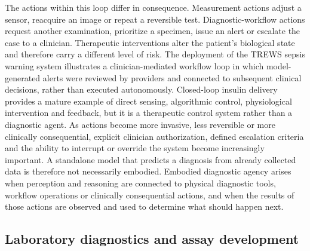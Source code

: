 \documentclass[12pt,a4paper]{article}
\begin{document}
The actions within this loop differ in consequence. Measurement actions adjust a sensor, reacquire an image or repeat a reversible test. Diagnostic-workflow actions request another examination, prioritize a specimen, issue an alert or escalate the case to a clinician. Therapeutic interventions alter the patient's biological state and therefore carry a different level of risk. The deployment of the TREWS sepsis warning system illustrates a clinician-mediated workflow loop in which model-generated alerts were reviewed by providers and connected to subsequent clinical decisions, rather than executed autonomously. Closed-loop insulin delivery provides a mature example of direct sensing, algorithmic control, physiological intervention and feedback, but it is a therapeutic control system rather than a diagnostic agent. As actions become more invasive, less reversible or more clinically consequential, explicit clinician authorization, defined escalation criteria and the ability to interrupt or override the system become increasingly important. A standalone model that predicts a diagnosis from already collected data is therefore not necessarily embodied. Embodied diagnostic agency arises when perception and reasoning are connected to physical diagnostic tools, workflow operations or clinically consequential actions, and when the results of those actions are observed and used to determine what should happen next.


\subsection{Laboratory diagnostics and assay development}
\label{subsec:laboratory_diagnostics}


\end{document}
